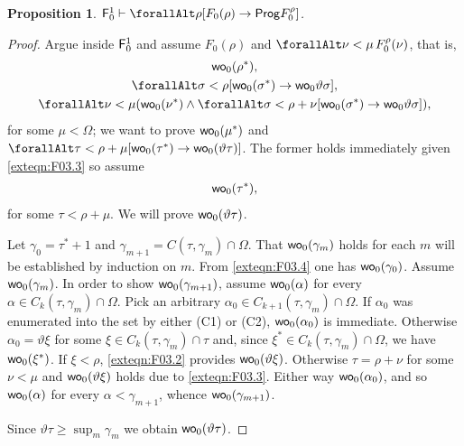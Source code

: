 \documentclass[UKenglish,cleveref,DIV=12]{scrartcl}
\let\forall\forallAlt
\newtheorem{proposition}[lemma]{Proposition}
\theoremstyle{definition}
\theoremstyle{definition}
\begin{document}
\begin{proposition}\label{extprop:F0genwellordering}
  $\F_0^1\proves \forall\rho[F_0(\rho)\rightarrow \Prog  F_0^\rho]$.
\end{proposition}
\begin{proof}
Argue inside $\mathsf{F}_0^1$ and assume $F_0(\rho)$ and $\forall\nu<\mu\,F_0^\rho(\nu)$, that is,
\begin{gather}
  \wo_0(\rho^*),\label{exteqn:F03.1}\\
  \forall\sigma<\rho[\wo_0(\sigma^*)\rightarrow\wo_0\vartheta\sigma],\label{exteqn:F03.2}\\
  \forall\nu<\mu(\wo_0(\nu^*)\land\forall\sigma<\rho+\nu[\wo_0(\sigma^*)\rightarrow \wo_0\vartheta\sigma]),\label{exteqn:F03.3}
\end{gather}
for some $\mu<\Omega$; we want to prove $\mathsf{wo}_0(\mu^*)$ and $\forall\tau<\rho+\mu[\wo_0(\tau^*)\rightarrow \wo_0(\vartheta\tau)]$. The former holds immediately given \cref{exteqn:F03.3} so assume
\begin{gather}
  \mathsf{wo}_0(\tau^*),\label{exteqn:F03.4}
\end{gather}
for some $\tau<\rho+\mu$. We will prove $\mathsf{wo}_0(\vartheta\tau)$.

Let $\gamma_0=\tau^*+1$ and $\gamma_{m+1} = C(\tau,\gamma_m)\cap \Omega$. That $\mathsf{wo}_0(\gamma_m)$ holds for each $m$ will be established by induction on $m$. From
\cref{exteqn:F03.4} one has $\mathsf{wo}_0(\gamma_0)$. Assume $\mathsf{wo}_0(\gamma_m)$. In
order to show $\mathsf{wo}_0(\gamma_{m+1})$, assume $\mathsf{wo}_0(\alpha)$ for every
$\alpha\in C_k(\tau,\gamma_m)\cap\Omega$. Pick an arbitrary $\alpha_0\in
C_{k+1}(\tau,\gamma_m)\cap\Omega$. If $\alpha_0$ was enumerated into the set by
either (C1) or (C2), $\mathsf{wo}_0(\alpha_0)$ is immediate. Otherwise
$\alpha_0=\vartheta\xi$ for some $\xi\in C_k(\tau,\gamma_m)\cap\tau$ and, since
$\xi^*\in C_k(\tau,\gamma_m)\cap\Omega$, we have $\mathsf{wo}_0(\xi^*)$. If $\xi<\rho$,
\cref{exteqn:F03.2} provides $\mathsf{wo}_0(\vartheta\xi)$. Otherwise $\tau=\rho+\nu$
for some $\nu<\mu$ and $\mathsf{wo}_0(\vartheta\xi)$ holds due to \cref{exteqn:F03.3}.
Either way $\mathsf{wo}_0(\alpha_0)$, and so $\mathsf{wo}_0(\alpha)$ for every
$\alpha<\gamma_{m+1}$, whence $\mathsf{wo}_0(\gamma_{m+1})$.

Since $\vartheta\tau\ge\sup_m\gamma_m$ we obtain $\mathsf{wo}_0(\vartheta\tau)$.
\end{proof}
\end{document}

